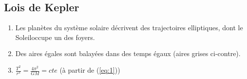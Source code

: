 \documentclass[a5paper,10pt]{article}
\begin{document}
\subsection{Lois de Kepler}
\begin{minipage}[t]{0.55\linewidth}
    \begin{enumerate}
        \item Les planètes du système solaire décrivent des trajectoires elliptiques, dont le Soleil\linebreak occupe un des foyers.
        \item Des aires égales sont balayées dans des temps égaux (aires grises ci-contre).
        \item $\displaystyle \frac{T^2}{r^3}=\frac{4\pi^2}{GM}=cte$ \qquad (à partir de (\ref{eq:1}))
    \end{enumerate}
\end{minipage}
\end{document}
